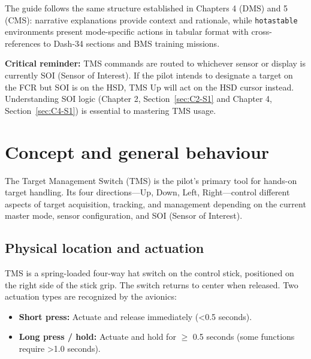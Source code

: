 \documentclass[11pt, a4paper, twoside]{report}
\begin{document}
The guide follows the same structure established in Chapters 4 (DMS) and 5 (CMS): narrative explanations provide context and rationale, while \texttt{hotastable} environments present mode-specific actions in tabular format with cross-references to Dash-34 sections and BMS training missions.

\textbf{Critical reminder:} TMS commands are routed to whichever sensor or display is currently SOI (Sensor of Interest). If the pilot intends to designate a target on the FCR but SOI is on the HSD, TMS Up will act on the HSD cursor instead. Understanding SOI logic (Chapter 2, Section~\ref{sec:C2-S1} and Chapter 4, Section~\ref{sec:C4-S1}) is essential to mastering TMS usage.

\newpage
\section{Concept and general behaviour}
\label{sec:C3-S1}

The Target Management Switch (TMS) is the pilot's primary tool for hands-on target handling. Its four directions---Up, Down, Left, Right---control different aspects of target acquisition, tracking, and management depending on the current master mode, sensor configuration, and SOI (Sensor of Interest).

\subsection{Physical location and actuation}
\label{sec:C3-S1-S1}

TMS is a spring-loaded four-way hat switch on the control stick, positioned on the right side of the stick grip. The switch returns to center when released. Two actuation types are recognized by the avionics:

\begin{itemize}
    \item \textbf{Short press:} Actuate and release immediately (<0.5 seconds).
    \item \textbf{Long press / hold:} Actuate and hold for $\geq$ 0.5 seconds (some functions require >1.0 seconds).
\end{itemize}
\end{document}
